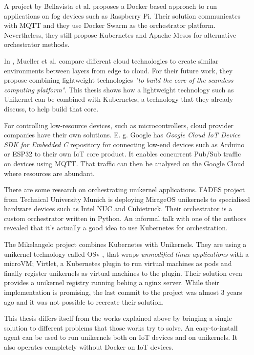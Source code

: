 A project by Bellavista et al. \cite{Bellavista2017} proposes a Docker based approach to run applications on fog devices such as Raspberry Pi. Their solution communicates with MQTT and they use Docker Swarm as the orchestrator platform. Nevertheless, they still propose Kubernetes and Apache Mesos for alternative orchestrator methods.

In \cite{Mueller2017}, Mueller et al. compare different cloud technologies to create similar environments between layers from edge to cloud. For their future work, they propose combining lightweight technologies \textit{"to build the core of the seamless computing platform"}. This thesis shows how a lightweight technology such as Unikernel can be combined with Kubernetes, a technology that they already discuss, to help build that core.

For controlling low-resource devices, such as microcontrollers, cloud provider companies have their own solutions. E. g. Google has \textit{Google Cloud IoT Device SDK for Embedded C} repository for connecting low-end devices such as Arduino or ESP32 to their own IoT core product. It enables concurrent Pub/Sub traffic on devices using MQTT. That traffic can then be analysed on the Google Cloud where resources are abundant.

There are some research on orchestrating unikernel applications. FADES project \cite{fades} from Technical University Munich is deploying MirageOS unikernels to specialised hardware devices such as Intel NUC and Cubietruck. Their orchestrator is a custom orchestrator written in Python. An informal talk with one of the authors revealed that it's actually a good idea to use Kubernetes for orchestration.

The Mikelangelo project \cite{Struckmann2018} combines Kubernetes with Unikernels. They are using a unikernel technology called OSv \cite{osv}, that wraps \textit{unmodified linux applications} with a microVM; Virtlet, a Kubernetes plugin to run virtual machines as pods and finally register unikernels as virtual machines to the plugin. Their solution even provides a unikernel registry running behing a nginx server. While their implementation is promising, the last commit to the project was almost 3 years ago and it was not possible to recreate their solution.

This thesis differs itself from the works explained above by bringing a single solution to different problems that those works try to solve. An easy-to-install agent can be used to run unikernels both on IoT devices and on unikernels. It also operates completely without Docker on IoT devices.